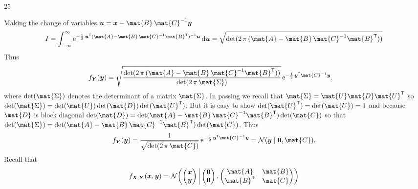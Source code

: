 \documentclass{sotonExamBoxes}    %
\renewcommand{\det}[1]{\textrm{det}({#1})}
\begin{document}
\begin{question}{25}
\begin{qparts}
{\begin{answer}
         Making the change of variables $\bm{u} =
         \bm{x}-\mat{B}\,\mat{C}^{-1}\bm{y}$
          \begin{align*}
           I  =   \int_{-\infty}^{\infty}
           \e{- \frac{1}{2}\,\bm{u}^\tr (\mat{A}-
           \mat{B}\,\mat{C}^{-1}\mat{B}^\tr)^{-1}\bm{u}} \, \dd \bm{u}
            = \sqrt{\det{2\,\pi\,(\mat{A}-\mat{B}\,\mat{C}^{-1}\mat{B}^\tr)}}  
         \end{align*}
         Thus
         \begin{align*}
            f_{\bm{Y}}(\bm{y})&=\sqrt{\frac{\det{2\,\pi\,(\mat{A}-
                         \mat{B}\,\mat{C}^{-1}\mat{B}^\tr)}}{\det{2\,\pi\,\mat{\Sigma}}}}
                         \, \e{- \frac{1}{2}\, \bm{y}^{\tr} \mat{C}^{-1}
                         \bm{y}}.
         \end{align*}
         where $\det{\mat{\Sigma}}$ denotes the determinant of a matrix $\mat{\Sigma}$.
         In passing we recall that $\mat{\Sigma}=\mat{U}\mat{D}\mat{U}^\tr$
         so $\det{\mat{\Sigma}}=\det{\mat{U}}\,\det{\mat{D}}\,\det{\mat{U}^\tr}$,  But it
         is easy to show $\det{\mat{U}^{\tr}} = \det{\mat{U}} =1$  and because
         $\mat{D}$ is block diagonal $\det{\mat{D}} = \det{\mat{A}-
         \mat{B}\,\mat{C}^{-1}\mat{B}^{\tr}} \, \det{\mat{C}}$ so that  $\det{\mat{\Sigma}} = \det{\mat{A}-
         \mat{B}\,\mat{C}^{-1}\mat{B}^{\tr}} \, \det{\mat{C}}$.  Thus
         \begin{align*}
           f_{\bm{Y}}(\bm{y}) = \frac{1}{\sqrt{\det{2\,\pi\,\mat{C}}}}\, \e{-
           \frac{1}{2}\, \bm{y}^{\tr} \mat{C}^{-1} \bm{y}} = \mathcal{N}(\bm{y}
           \mid \bm{0}, \mat{C}).
         \end{align*}
         Recall that
           \begin{align*}
             f_{\bm{X},\bm{Y}}(\bm{x}, \bm{y}) = \mathcal{N}
             \!\left( \begin{pmatrix}\bm{x}\\ \bm{y}\end{pmatrix}
             \,\middle|\, \begin{pmatrix} \bm{0} \\
               \bm{0} \end{pmatrix}, \begin{pmatrix} \mat{A} & \mat{B}\\
               \mat{B}^{\tr} & \mat{C} \end{pmatrix} \right) 
           \end{align*}

\end{answer}}
\end{qparts}
\end{question}
\end{document}
